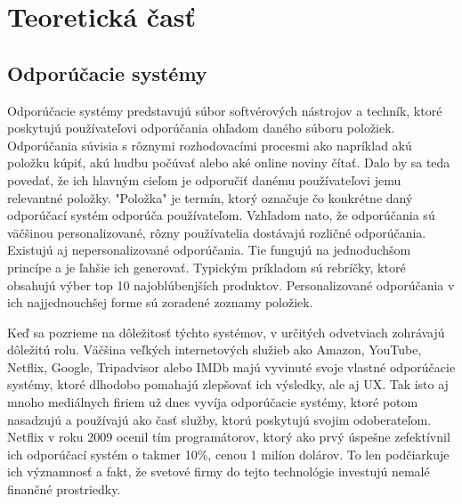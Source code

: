 \section{Teoretická časť}

\subsection{Odporúčacie systémy}
 Odporúčacie systémy predstavujú súbor softvérových nástrojov a techník, ktoré poskytujú používateľovi odporúčania ohľadom daného súboru položiek. Odporúčania súvisia s rôznymi rozhodovacími procesmi ako napríklad akú položku kúpiť, akú hudbu počúvať alebo aké online noviny  čítať. \cite{rs1} Dalo by sa teda povedať, že ich hlavným cieľom je odporučiť danému používateľovi jemu relevantné položky. "Položka" je termín, ktorý označuje čo konkrétne daný odporúčací systém odporúča používateľom. Vzhľadom nato, že odporúčania sú väčšinou personalizované, rôzny používatelia dostávajú rozličné odporúčania. Existujú aj nepersonalizované odporúčania. Tie fungujú na jednoduchšom princípe a je ľahšie ich generovať. Typickým príkladom sú rebríčky, ktoré obsahujú výber top 10 najoblúbenjších produktov. Personalizované odporúčania v ich najjednouchšej forme sú zoradené zoznamy položiek.
 
Keď sa pozrieme na dôležitosť týchto systémov, v určitých odvetviach zohrávajú dôležitú rolu. Väčšina veľkých internetových služieb ako Amazon, YouTube, Netflix, Google, Tripadvisor alebo IMDb majú vyvinuté svoje vlastné odporúčacie systémy, ktoré dlhodobo pomahajú zlepšovať ich výsledky, ale aj UX. Tak isto aj mnoho mediálnych firiem už dnes vyvíja odporúčacie systémy, ktoré potom nasadzujú a používajú ako časť služby, ktorú poskytujú svojim odoberateľom. Netflix v roku 2009 ocenil tím programátorov, ktorý ako prvý úspešne zefektívnil ich odporúčací systém o takmer 10\%, cenou 1 milíon dolárov. To len podčiarkuje ich významnosť a fakt, že svetové firmy do tejto technológie investujú nemalé finančné prostriedky.  \\

